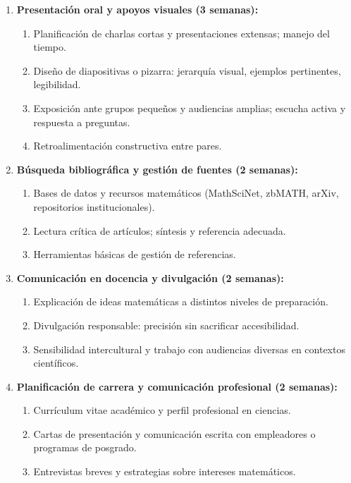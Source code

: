 \begin{refsection}
\begin{enumerate}
\item \textbf{Presentación oral y apoyos visuales (3 semanas):}
\begin{enumerate}
    \item Planificación de charlas cortas y presentaciones extensas; manejo del tiempo.
    \item Diseño de diapositivas o pizarra: jerarquía visual, ejemplos pertinentes, legibilidad.
    \item Exposición ante grupos pequeños y audiencias amplias; escucha activa y respuesta a preguntas.
    \item Retroalimentación constructiva entre pares.
\end{enumerate}

\item \textbf{Búsqueda bibliográfica y gestión de fuentes (2 semanas):}
\begin{enumerate}
    \item Bases de datos y recursos matemáticos (MathSciNet, zbMATH, arXiv, repositorios institucionales).
    \item Lectura crítica de artículos; síntesis y referencia adecuada.
    \item Herramientas básicas de gestión de referencias.
\end{enumerate}

\item \textbf{Comunicación en docencia y divulgación (2 semanas):}
\begin{enumerate}
    \item Explicación de ideas matemáticas a distintos niveles de preparación.
    \item Divulgación responsable: precisión sin sacrificar accesibilidad.
    \item Sensibilidad intercultural y trabajo con audiencias diversas en contextos científicos.
\end{enumerate}

\item \textbf{Planificación de carrera y comunicación profesional (2 semanas):}
\begin{enumerate}
    \item Currículum vitae académico y perfil profesional en ciencias.
    \item Cartas de presentación y comunicación escrita con empleadores o programas de posgrado.
    \item Entrevistas breves y estrategias sobre intereses matemáticos.
\end{enumerate}


\end{enumerate}
\end{refsection}
